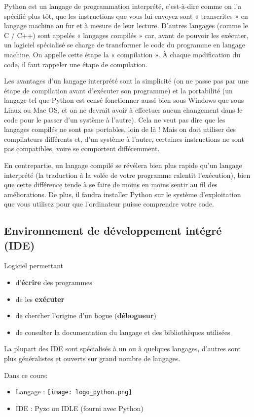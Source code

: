 Python est un langage de programmation interprété, c'est-à-dire comme on l'a spécifié plus tôt, que les instructions que vous lui envoyez sont « transcrites » en langage machine au fur et à mesure de leur lecture. D'autres langages (comme le C / C++) sont appelés « langages compilés » car, avant de pouvoir les exécuter, un logiciel spécialisé se charge de transformer le code du programme en langage machine. On appelle cette étape la « compilation ». À chaque modification du code, il faut rappeler une étape de compilation.

Les avantages d'un langage interprété sont la simplicité (on ne passe pas par une étape de compilation avant d'exécuter son programme) et la portabilité (un langage tel que Python est censé fonctionner aussi bien sous Windows que sous Linux ou Mac OS, et on ne devrait avoir à effectuer aucun changement dans le code pour le passer d'un système à l'autre). Cela ne veut pas dire que les langages compilés ne sont pas portables, loin de là ! Mais on doit utiliser des compilateurs différents et, d'un système à l'autre, certaines instructions ne sont pas compatibles, voire se comportent différemment.

En contrepartie, un langage compilé se révélera bien plus rapide qu'un langage interprété (la traduction à la volée de votre programme ralentit l'exécution), bien que cette différence tende à se faire de moins en moins sentir au fil des améliorations. De plus, il faudra installer Python sur le système d'exploitation que vous utilisez pour que l'ordinateur puisse comprendre votre code.


\subsection{Environnement de développement intégré (IDE)}
Logiciel permettant
\begin{itemize}
\item d'\textbf{écrire} des programmes
\item de les \textbf{exécuter}
\item de chercher l'origine d'un bogue (\textbf{débogueur})
\item de consulter la documentation du langage et des bibliothèques utilisées
\end{itemize}

La plupart des IDE sont spécialisés à un ou à quelques langages,
d'autres sont plus généralistes et ouverts sur grand nombre de
langages.


Dans ce cours:
\begin{itemize}
\item Langage : \texttt{[image: logo\_python.png]}
\item IDE : Pyzo ou IDLE (fourni avec Python)
\end{itemize}


